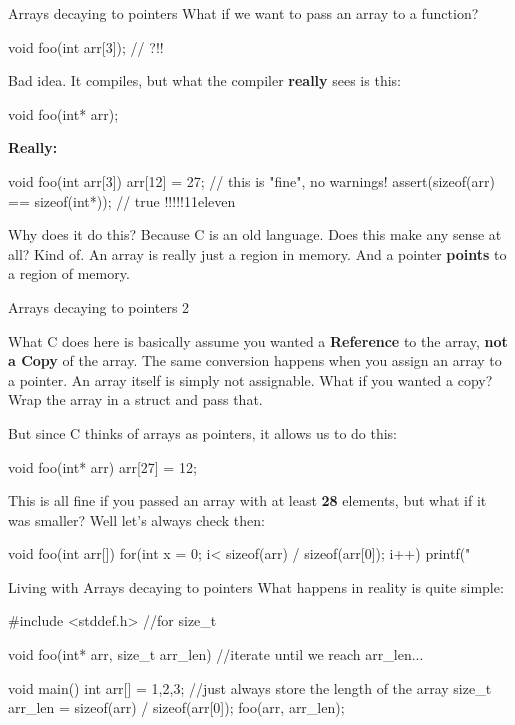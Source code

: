 \documentclass[10pt,graphics,aspectratio=169,table]{beamer}
\begin{document}
\begin{frame}[fragile]{Arrays decaying to pointers}
    What if we want to pass an array to a function?
    \begin{codeblock}
void foo(int arr[3]); // ?!!
    \end{codeblock}

    Bad idea. It compiles, but what the compiler \textbf{really} sees is this:
    \begin{codeblock}
void foo(int* arr);
    \end{codeblock} 

    \textbf{Really:}
    \begin{codeblock}
void foo(int arr[3]){
    arr[12] = 27; // this is "fine", no warnings!
    assert(sizeof(arr) == sizeof(int*)); // true !!!!!11eleven
}
    \end{codeblock} 

    Why does it do this? Because C is an old language.
    Does this make any sense at all? Kind of. 
    An array is really just a region in memory. And a pointer 
    \textbf{points} to a region of memory.
 
\end{frame}

\begin{frame}[fragile]{Arrays decaying to pointers 2}
   
    
    What C does here is basically assume you wanted a \textbf{Reference} to 
    the array,  \textbf{not a Copy} of the array. The same conversion happens
    when you assign an array to a pointer. An array itself is simply not
    assignable. What if you wanted a copy? 
    Wrap the array in a struct and pass that. 

    But since C thinks of arrays as pointers, it allows us to do this:
    \begin{codeblock}
void foo(int* arr){
    arr[27] = 12;
}
    \end{codeblock} 

    This is all fine if you passed an array with at least \textbf{28}
    elements, but what if it was smaller? Well let's always check then:
\begin{codeblock}
void foo(int arr[]){ 
   for(int x = 0; i< sizeof(arr) / sizeof(arr[0]); i++){
       printf("%
   }
}
\end{codeblock} 
\end{frame}

\begin{frame}[fragile]{Living with Arrays decaying to pointers}
What happens in reality is quite simple:
\begin{codeblock} 
#include <stddef.h> //for size_t

void foo(int* arr, size_t arr_len){ 
    //iterate until we reach arr_len...
}

void main(){
    int arr[] = {1,2,3};
    //just always store the length of the array
    size_t arr_len = sizeof(arr) / sizeof(arr[0]); 
    foo(arr, arr_len);
}
\end{codeblock} 
\end{frame}
\end{document}
